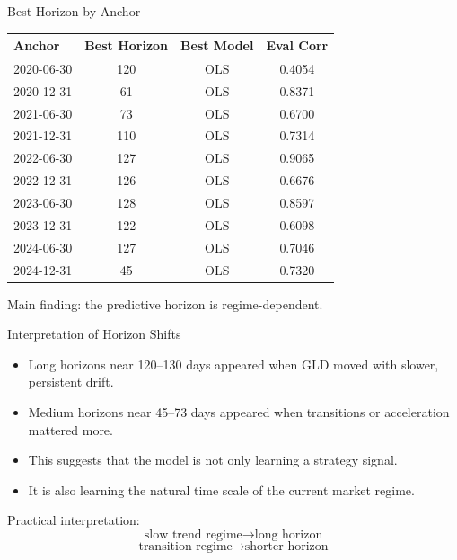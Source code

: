 \documentclass[aspectratio=169]{beamer}
\begin{document}
\begin{frame}{Best Horizon by Anchor}
  \small
  \begin{tabular}{lccc}
    \toprule
    Anchor & Best Horizon & Best Model & Eval Corr \\
    \midrule
    2020-06-30 & 120 & OLS & 0.4054 \\
    2020-12-31 & 61  & OLS & 0.8371 \\
    2021-06-30 & 73  & OLS & 0.6700 \\
    2021-12-31 & 110 & OLS & 0.7314 \\
    2022-06-30 & 127 & OLS & 0.9065 \\
    2022-12-31 & 126 & OLS & 0.6676 \\
    2023-06-30 & 128 & OLS & 0.8597 \\
    2023-12-31 & 122 & OLS & 0.6098 \\
    2024-06-30 & 127 & OLS & 0.7046 \\
    2024-12-31 & 45  & OLS & 0.7320 \\
    \bottomrule
  \end{tabular}

  \vspace{0.7em}
  Main finding: the predictive horizon is regime-dependent.
\end{frame}

\begin{frame}{Interpretation of Horizon Shifts}
  \begin{itemize}
    \item Long horizons near 120--130 days appeared when GLD moved with slower, persistent drift.
    \item Medium horizons near 45--73 days appeared when transitions or acceleration mattered more.
    \item This suggests that the model is not only learning a strategy signal.
    \item It is also learning the natural time scale of the current market regime.
  \end{itemize}

  \vspace{0.6em}
  Practical interpretation:
  \[
    \text{slow trend regime} \rightarrow \text{long horizon}
  \]
  \[
    \text{transition regime} \rightarrow \text{shorter horizon}
  \]
\end{frame}
\end{document}
